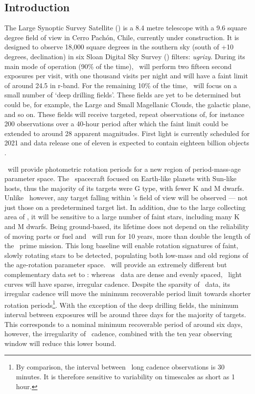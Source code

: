 \subsection{Introduction}

The Large Synoptic Survey Satellite (\LSST) is a 8.4 metre telescope with a
9.6 square degree field of view in Cerro Pach\'{o}n, Chile, currently under
construction.
It is designed to observe 18,000 square degrees in the southern sky (south of
+10 degrees, declination) in six Sloan Digital Sky Survey (\SDSS) filters:
{\it ugrizy}.
During its main mode of operation (90\% of the time), \LSST\ will perform two
fifteen second exposures per visit, with one thousand visits per night and
will have a faint limit of around 24.5 in r-band.
For the remaining 10\% of the time, \LSST\ will focus on a small number of
`deep drilling fields'.
These fields are yet to be determined but could be, for example, the Large and
Small Magellanic Clouds, the galactic plane, and so on.
These fields will receive targeted, repeat observations of, for instance 200
observations over a 40-hour period after which the faint limit could be
extended to around 28 apparent magnitudes.
First light is currently scheduled for 2021 and data release one of eleven is
expected to contain eighteen billion objects \citep{Ivezic2008}.

\LSST\ will provide photometric rotation periods for a new region of
period-mass-age parameter space.
The \kepler\ spacecraft focused on Earth-like planets with Sun-like hosts,
thus the majority of its targets were G type, with fewer K and M dwarfs.
Unlike \kepler\ however, any target falling within \LSST's field of view will
be observed --- not just those on a predetermined target list.
In addition, due to the large collecting area of \LSST, it will be sensitive
to a large number of faint stars, including many K and M dwarfs.
Being ground-based, its lifetime does not depend on the reliability of moving
parts or fuel and \LSST\ will run for 10 years, more than double the length of
the \kepler\ prime mission.
This long baseline will enable rotation signatures of faint, slowly rotating
stars to be detected, populating both low-mass and old regions of the
age-rotation parameter space.
\LSST\ will provide an extremely different but complementary data set to
\kepler: whereas \kepler\ data are dense and evenly spaced, \LSST\ light
curves will have sparse, irregular cadence.
Despite the sparsity of \LSST\ data, its irregular cadence will move the
minimum recoverable period limit towards shorter rotation periods\footnote{By
comparison, the interval between \kepler\ long cadence observations is 30
minutes. It is therefore sensitive to variability on timescales as short as
1 hour.}.
With the exception of the deep drilling fields, the minimum interval
between exposures will be around three days for the majority of targets.
This corresponds to a nominal minimum recoverable period of around six days,
however, the irregularity of \LSST\ cadence, combined with the ten year
observing window will reduce this lower bound.

